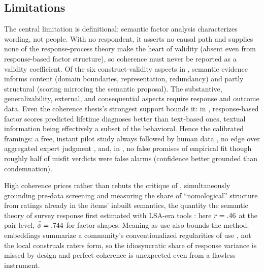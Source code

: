 \subsection{Limitations}

The central limitation is definitional: semantic factor analysis
characterizes wording, not people. With no respondent, it asserts no
causal path and supplies none of the response-process theory
\citet{borsboom-etal-2004} make the heart of validity (absent even from
response-based factor structure), so coherence must never be reported as
a validity coefficient. Of the six construct-validity aspects in
\citet{messick-1995}, semantic evidence informs content (domain
boundaries, representation, redundancy) and partly structural (scoring
mirroring the semantic proposal). The substantive, generalizability,
external, and consequential aspects require response and outcome data. Even the
coherence thesis's strongest support bounds it: in
\citet{kojima-etal-2026}, response-based factor scores predicted lifetime
diagnoses better than text-based ones, textual information being
effectively a subset of the behavioral. Hence the calibrated framings: a
free, instant pilot study always followed by human data
\citep{hommel-arslan-2025}, no edge over aggregated expert judgment
\citep{schoenegger-etal-2025}, and, in \citet{feraco-toffalini-2025}, no
false promises of empirical fit though roughly half of misfit verdicts
were false alarms (confidence better grounded than condemnation).

High coherence prices rather than rebuts the critique of
\citet{uher-2025}, simultaneously grounding pre-data screening and
measuring the share of ``nomological'' structure from ratings already in
the items' inbuilt semantics, the quantity the semantic theory of survey
response first estimated with LSA-era tools
\citep{arnulf-etal-2014, arnulf-etal-2018}: here $r = .46$ at the
pair level, $\bar{\phi} = .744$ for factor shapes. Meaning-as-use also bounds the
method: embeddings summarize a community's conventionalized regularities
of use \citep[\S43]{wittgenstein-1953}, not the local construals raters
form, so the idiosyncratic share of response variance is missed by design
and perfect coherence is unexpected even from a flawless instrument.

